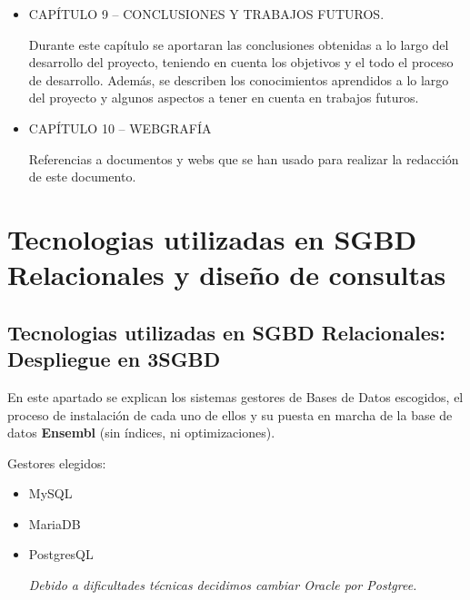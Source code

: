 \documentclass[12pt,a4paper]{article}
\begin{document}
\begin{itemize}
\item CAPÍTULO 9 – CONCLUSIONES Y TRABAJOS FUTUROS. 

Durante este capítulo se aportaran las conclusiones obtenidas a lo largo del desarrollo del proyecto, teniendo en cuenta los objetivos y el todo el proceso de desarrollo. Además, se describen los conocimientos aprendidos a lo largo del proyecto y algunos aspectos a tener en cuenta en trabajos futuros. 

\item 
CAPÍTULO 10 – WEBGRAFÍA

Referencias a documentos y webs que se han usado para realizar la redacción de este documento.

\end{itemize}




\newpage
\section{Tecnologias utilizadas en SGBD Relacionales y diseño de consultas} \label{pto2} 


\subsection{Tecnologias utilizadas en SGBD Relacionales: Despliegue en 3SGBD} \label{pto21}

En este apartado se explican los sistemas gestores de Bases de Datos escogidos, el proceso de instalación de cada uno de ellos y su puesta en marcha de la base de datos \textbf{Ensembl} (sin índices, ni optimizaciones).



Gestores elegidos:

\begin{itemize}
\item MySQL
\item MariaDB
\item PostgresQL

\textit{Debido a dificultades técnicas decidimos cambiar Oracle por Postgree.}
\end{itemize}
\end{document}
